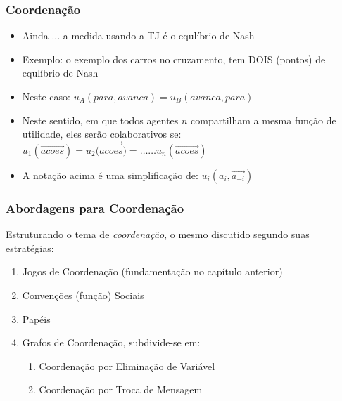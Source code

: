 
\begin{frame}
\frametitle{Coordenação}
\begin{itemize}
  \item Ainda ... a medida usando a TJ é o equlíbrio de Nash
  \item Exemplo: o exemplo dos carros no cruzamento, tem DOIS (pontos) de equlíbrio de Nash
  \item Neste caso: $u_A(para,avanca) = u_B(avanca, para)$
  \pause
  \item Neste sentido, em que todos agentes $n$ compartilham a mesma função de utilidade, eles serão colaborativos se:
  $u_1(\overrightarrow{acoes}) = u_2\overrightarrow{(acoes}) = \ldots \ldots  u_n(\overrightarrow{acoes})$
  
  \item A notação acima é uma simplificação de: 
  $u_i(a_i, \overrightarrow{a_{-i}})$ 
  
  \end{itemize}


\end{frame}


\begin{frame}
\frametitle{Abordagens para  Coordenação}
 
 Estruturando o tema de \textit{coordenação}, o mesmo
 discutido segundo suas estratégias:

 \begin{enumerate}
   \item Jogos de Coordenação (fundamentação no capítulo anterior)
   \item Convenções (função) Sociais
   \item Papéis
   \item Grafos de Coordenação, subdivide-se em:
        \begin{enumerate}
          \item Coordenação por Eliminação de Variável
          \item Coordenação por Troca de Mensagem
        \end{enumerate}
   
   
 \end{enumerate}




\end{frame}



